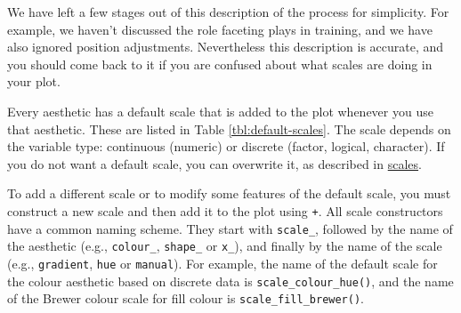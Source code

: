We have left a few stages out of this description of the process for
simplicity. For example, we haven't discussed the role faceting plays in
training, and we have also ignored position adjustments. Nevertheless
this description is accurate, and you should come back to it if you are
confused about what scales are doing in your plot.


Every aesthetic has a default scale that is added to the plot whenever
you use that aesthetic. These are listed in Table
\ref{tbl:default-scales}. The scale depends on the variable type:
continuous (numeric) or discrete (factor, logical, character). If you do
not want a default scale, you can overwrite it, as described in
\hyperref[sub:customise-scales]{scales}.

To add a different scale or to modify some features of the default
scale, you must construct a new scale and then add it to the plot using
\texttt{+}. \indexc{+} All scale constructors have a common naming
scheme. They start with \texttt{scale\_}, followed by the name of the
aesthetic (e.g., \texttt{colour\_}, \texttt{shape\_} or \texttt{x\_}),
and finally by the name of the scale (e.g., \texttt{gradient},
\texttt{hue} or \texttt{manual}). For example, the name of the default
scale for the colour aesthetic based on discrete data is
\texttt{scale\_colour\_hue()}, and the name of the Brewer colour scale
for fill colour is \texttt{scale\_fill\_brewer()}. 


